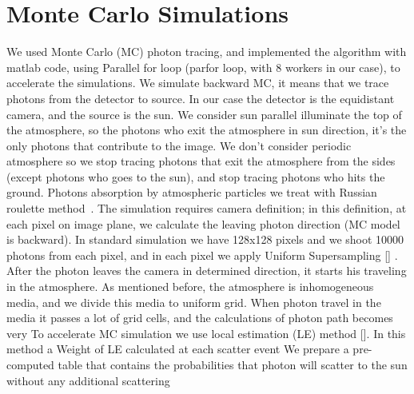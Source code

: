\documentclass[article.tex]{subfiles}
\begin{document}
\section{Monte Carlo Simulations}
\label{sec:monte-carlo-simul}

We used Monte Carlo (MC) photon tracing, and implemented the algorithm with matlab code, using Parallel for loop (parfor loop, with 8 workers in our case), to accelerate the simulations. 
We simulate backward MC, it means that we trace photons from the detector to source. In our case the detector is the equidistant camera, and the source is the sun. We consider sun parallel illuminate the top of the atmosphere, so the photons who exit the atmosphere in sun direction, it’s the only photons that contribute to the image. We don't consider periodic atmosphere so we stop tracing photons that exit the atmosphere from the sides (except photons who goes to the sun), and stop tracing photons who hits the ground. Photons absorption by atmospheric particles we treat with Russian roulette method~\cite{Buras2011}.
The simulation requires camera definition; in this definition, at each pixel on image plane, we calculate the leaving photon direction (MC model is backward). In standard simulation we have 128x128 pixels and we shoot 10000 photons from each pixel, and in each pixel we apply Uniform Supersampling [] . 
After the photon leaves the camera in determined direction, it starts his traveling in the atmosphere.
As mentioned before, the atmosphere is inhomogeneous media, and we divide this media to uniform grid. When photon travel in the media it passes a lot of grid cells, and the calculations of photon path becomes very  
To accelerate MC simulation we use local estimation (LE) method []. In this method a Weight of LE calculated at each scatter event 
 We prepare a pre-computed table that contains the probabilities that photon will scatter to the sun without any additional scattering
\end{document}
